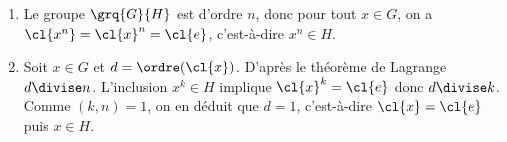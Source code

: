 \begin{enumerate}
  \item 
    Le groupe $\grq{G}{H}$ est d'ordre $n$, donc pour tout $x\in G$, on a
    $\cl{x^n}=\cl{x}^n=\cl{e}$, c'est-à-dire $x^n\in H$.
  \item 
    Soit $x\in G$ et $d=\ordre(\cl{x})$. D'après le théorème de Lagrange
    $d\divise n$. L'inclusion $x^k\in H$ implique $\cl{x}^k=\cl{e}$
    donc $d\divise k$. Comme $(k,n)=1$, on en déduit que $d=1$, c'est-à-dire
    $\cl{x}=\cl{e}$ puis $x\in H$.
\end{enumerate}
